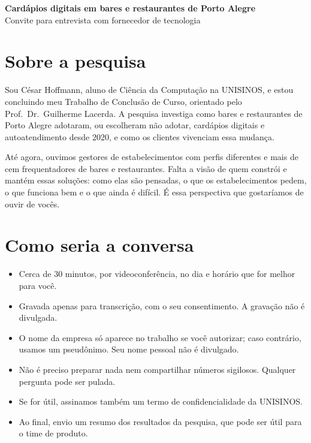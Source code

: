 \documentclass[11pt,a4paper]{article}
\begin{document}
\begin{center}
  {\Large\bfseries Cardápios digitais em bares e restaurantes de Porto Alegre}\\[0.3em]
  {\large Convite para entrevista com fornecedor de tecnologia}
\end{center}

\section*{\normalsize Sobre a pesquisa}

Sou César Hoffmann, aluno de Ciência da Computação na UNISINOS, e estou concluindo meu Trabalho de Conclusão de Curso, orientado pelo Prof.\ Dr.\ Guilherme Lacerda. A pesquisa investiga como bares e restaurantes de Porto Alegre adotaram, ou escolheram não adotar, cardápios digitais e autoatendimento desde 2020, e como os clientes vivenciam essa mudança.

Até agora, ouvimos gestores de estabelecimentos com perfis diferentes e mais de cem frequentadores de bares e restaurantes. Falta a visão de quem constrói e mantém essas soluções: como elas são pensadas, o que os estabelecimentos pedem, o que funciona bem e o que ainda é difícil. É essa perspectiva que gostaríamos de ouvir de vocês.

\section*{\normalsize Como seria a conversa}

\begin{itemize}
  \item Cerca de 30 minutos, por videoconferência, no dia e horário que for melhor para você.
  \item Gravada apenas para transcrição, com o seu consentimento. A gravação não é divulgada.
  \item O nome da empresa só aparece no trabalho se você autorizar; caso contrário, usamos um pseudônimo. Seu nome pessoal não é divulgado.
  \item Não é preciso preparar nada nem compartilhar números sigilosos. Qualquer pergunta pode ser pulada.
  \item Se for útil, assinamos também um termo de confidencialidade da UNISINOS.
  \item Ao final, envio um resumo dos resultados da pesquisa, que pode ser útil para o time de produto.
\end{itemize}
\end{document}
